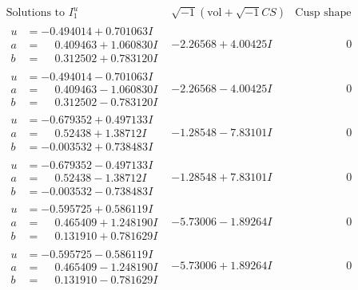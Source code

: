 \documentclass[1p]{elsarticle_modified}
\theoremstyle{definition}
\newcommand{\I}{\sqrt{-1}}
\begin{document}
$$\begin{array}{c|c|c}  
\text{Solutions to }I^u_{1}& \I (\text{vol} + \sqrt{-1}CS) & \text{Cusp shape}\\
 \hline 
\begin{aligned}
u &= -0.494014 + 0.701063 I \\
a &= \phantom{-}0.409463 + 1.060830 I \\
b &= \phantom{-}0.312502 + 0.783120 I\end{aligned}
 & -2.26568 + 4.00425 I & \phantom{-0.000000 } 0 \\ \hline\begin{aligned}
u &= -0.494014 - 0.701063 I \\
a &= \phantom{-}0.409463 - 1.060830 I \\
b &= \phantom{-}0.312502 - 0.783120 I\end{aligned}
 & -2.26568 - 4.00425 I & \phantom{-0.000000 } 0 \\ \hline\begin{aligned}
u &= -0.679352 + 0.497133 I \\
a &= \phantom{-}0.52438 + 1.38712 I \\
b &= -0.003532 + 0.738483 I\end{aligned}
 & -1.28548 - 7.83101 I & \phantom{-0.000000 } 0 \\ \hline\begin{aligned}
u &= -0.679352 - 0.497133 I \\
a &= \phantom{-}0.52438 - 1.38712 I \\
b &= -0.003532 - 0.738483 I\end{aligned}
 & -1.28548 + 7.83101 I & \phantom{-0.000000 } 0 \\ \hline\begin{aligned}
u &= -0.595725 + 0.586119 I \\
a &= \phantom{-}0.465409 + 1.248190 I \\
b &= \phantom{-}0.131910 + 0.781629 I\end{aligned}
 & -5.73006 - 1.89264 I & \phantom{-0.000000 } 0 \\ \hline\begin{aligned}
u &= -0.595725 - 0.586119 I \\
a &= \phantom{-}0.465409 - 1.248190 I \\
b &= \phantom{-}0.131910 - 0.781629 I\end{aligned}
 & -5.73006 + 1.89264 I & \phantom{-0.000000 } 0 \\ \hline\begin{aligned}

\end{aligned}
\end{array}$$
\end{document}
